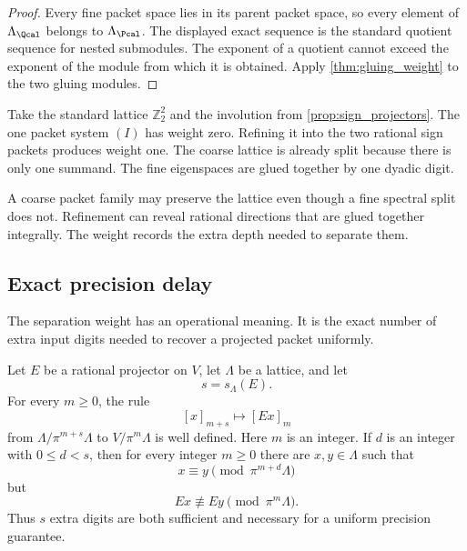 \begin{proof}
Every fine packet space lies in its parent packet space, so every element of $\Lambda_{\Qcal}$ belongs to $\Lambda_{\Pcal}$.  The displayed exact sequence is the standard quotient sequence for nested submodules.  The exponent of a quotient cannot exceed the exponent of the module from which it is obtained.  Apply \cref{thm:gluing_weight} to the two gluing modules.
\end{proof}

\begin{example}\label{ex:strict_weight_growth}
Take the standard lattice $\mathbb Z_2^2$ and the involution from \cref{prop:sign_projectors}.  The one packet system $(I)$ has weight zero.  Refining it into the two rational sign packets produces weight one.  The coarse lattice is already split because there is only one summand.  The fine eigenspaces are glued together by one dyadic digit.
\end{example}

\begin{remark}\label{rem:strict_growth}
A coarse packet family may preserve the lattice even though a fine spectral split does not.  Refinement can reveal rational directions that are glued together integrally.  The weight records the extra depth needed to separate them.
\end{remark}

\subsection{Exact precision delay}

The separation weight has an operational meaning.  It is the exact number of extra input digits needed to recover a projected packet uniformly.

\enlargethispage{\baselineskip}
\begin{theorem}\label{thm:precision_delay}
Let $E$ be a rational projector on $V$, let $\Lambda$ be a lattice, and let
\[
s=s_\Lambda(E).
\]
For every $m\geq0$, the rule
\[
[x]_{m+s}\longmapsto[Ex]_m
\]
from $\Lambda/\pi^{m+s}\Lambda$ to $V/\pi^m\Lambda$ is well defined.  Here $m$ is an integer.  If $d$ is an integer with $0\leq d<s$, then for every integer $m\geq0$ there are $x,y\in\Lambda$ such that
\[
x\equiv y\pmod{\pi^{m+d}\Lambda}
\]
but
\[
Ex\not\equiv Ey\pmod{\pi^m\Lambda}.
\]
Thus $s$ extra digits are both sufficient and necessary for a uniform precision guarantee.
\end{theorem}


